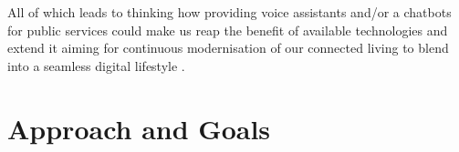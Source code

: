 




All of which leads to thinking how providing voice assistants and/or a chatbots for public services could make us reap the benefit of available technologies and extend it aiming for continuous modernisation of our connected living to blend into a seamless digital lifestyle \cite{dai:cl}. 






\section{Approach and Goals}



